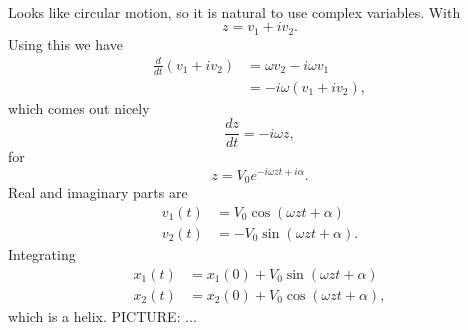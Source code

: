 {\begin{equation}
\begin{aligned}
\end{aligned}
\end{equation}
%
Looks like circular motion, so it is natural to use complex variables.  With
%
\begin{equation}\label{eqn:relativisticElectrodynamicsT3:740}
z = v_1 + i v_2.
\end{equation}
%
Using this we have
%
\begin{equation}\label{eqn:relativisticElectrodynamicsT3:1130}
\begin{aligned}
\frac{d}{dt} ( v_1 + i v_2 )
&=
\omega v_2 - i \omega v_1  \\
&= -i \omega ( v_1 + i v_2 ),
\end{aligned}
\end{equation}
which comes out nicely
%
\begin{equation}\label{eqn:relativisticElectrodynamicsT3:751}
\frac{dz}{dt} = -i \omega z,
\end{equation}
for
\begin{equation}\label{eqn:relativisticElectrodynamicsT3:780}
z = V_0 e^{-i \omega z t + i \alpha}.
\end{equation}
%
Real and imaginary parts are
%
\begin{equation}\label{eqn:relativisticElectrodynamicsT3:800}
\begin{aligned}
v_1(t) &= V_0 \cos( \omega z t + \alpha) \\
v_2(t) &= -V_0 \sin( \omega z t + \alpha).
\end{aligned}
\end{equation}
%
Integrating
\begin{equation}\label{eqn:relativisticElectrodynamicsT3:820}
\begin{aligned}
x_1(t) &= x_1(0) + V_0 \sin( \omega z t + \alpha) \\
x_2(t) &= x_2(0) + V_0 \cos( \omega z t + \alpha),
\end{aligned}
\end{equation}
which is a helix.
PICTURE: ...
} %
